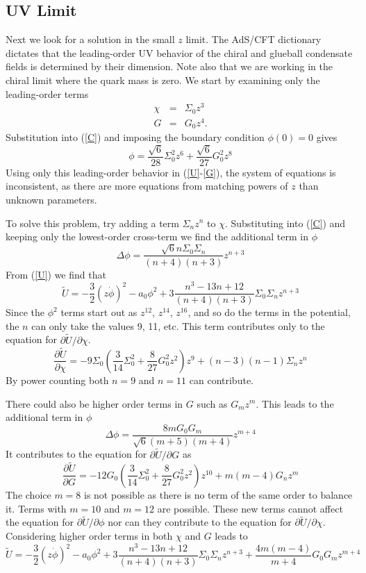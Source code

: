 \documentclass[12pt]{article}
\newcommand{\be}{\begin{equation}}
\newcommand{\ee}{\end{equation}}
\newcommand{\ba}{\begin{eqnarray}}
\newcommand{\ea}{\end{eqnarray}}
\def\tthalf{{\textstyle{\frac{3}{2}}}}
\def\phidot{\dot{\phi}}
\def\rt6{\sqrt{6}}
\begin{document}
\subsection{UV Limit}
Next we look for a solution in the small $z$ limit. 
The AdS/CFT dictionary dictates that the leading-order UV behavior of the chiral and glueball condensate fields is determined by their dimension. 
Note also that we are working in the chiral limit where the quark mass is zero. 
We start by examining only the leading-order terms
\ba
\chi &=& \Sigma_0 z^3 \\
G &=& G_0 z^4.
\ea
Substitution into (\ref{C}) and imposing the boundary condition $\phi(0)=0$ gives
\be
\phi = \frac{\rt6}{28} \Sigma_0^2 z^6 + \frac{\rt6}{27} G_0^2 z^8
\label{Sz}
\ee
Using only this leading-order behavior in (\ref{U}-\ref{G}), the system of equations is inconsistent, as there are more equations from matching powers of $z$ than unknown parameters. 

To solve this problem, try adding a term $\Sigma_n z^n$ to $\chi$.  
Substituting into (\ref{C}) and keeping only the lowest-order cross-term we find the additional term in $\phi$
\be
\Delta \phi = \frac{\rt6 n \Sigma_0 \Sigma_n}{(n+4)(n+3)} z^{n+3}
\ee
From (\ref{U}) we find that
\be
\tilde{U} = -\tthalf (z\phidot)^2 - a_0\phi^2 +3 \frac{n^3 -13n +12}{(n+4)(n+3)} \Sigma_0 \Sigma_n z^{n+3}
\ee
Since the $\phi^2$ terms start out as $z^{12}$, $z^{14}$, $z^{16}$, and so do the terms in the potential, the $n$ can only take the values 9, 11, etc.  
This term contributes only to the equation for $\partial \tilde{U}/\partial \chi$.
\be
\frac{\partial \tilde{U}}{\partial \chi} = -9\Sigma_0 \left( \frac{3}{14} \Sigma_0^2 + \frac{8}{27} G_0^2 z^2 \right) z^9 + (n-3)(n-1) \Sigma_n z^n
\ee
By power counting both $n=9$ and $n=11$ can contribute.  

There could also be higher order terms in $G$ such as $G_m z^m$.  
This leads to the additional term in $\phi$
\be
\Delta \phi = \frac{8 m G_0 G_m}{\rt6 (m+5)(m+4)} z^{m+4}
\ee
It contributes to the equation for $\partial \tilde{U}/\partial G$ as
\be
\frac{\partial \tilde{U}}{\partial G} = -12G_0 \left( \frac{3}{14} \Sigma_0^2 + \frac{8}{27} G_0^2 z^2 \right) z^{10}
+ m (m-4) G_n z^m
\ee
The choice $m=8$ is not possible as there is no term of the same order to balance it.  
Terms with $m=10$ and $m=12$ are possible.  
These new terms cannot affect the equation for $\partial \tilde{U}/\partial \phi$  nor can they contribute to the equation for $\partial \tilde{U}/\partial \chi$.  
Considering higher order terms in both $\chi$ and $G$ leads to
\be
\tilde{U} = -\tthalf (z\phidot)^2 - a_0\phi^2 +3 \frac{n^3 -13n +12}{(n+4)(n+3)} \Sigma_0 \Sigma_n z^{n+3}
+ \frac{4m(m-4)}{m+4} G_0 G_m z^{m+4}
\ee 
\end{document}
